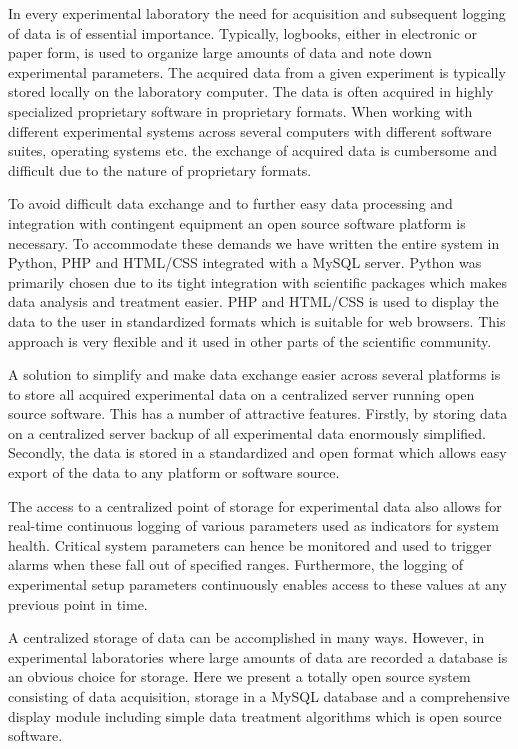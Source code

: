 In every experimental laboratory the need for acquisition and subsequent
logging of data is of essential importance. Typically, logbooks, either in
electronic or paper form, is used to organize large amounts of data and note
down experimental parameters. The acquired data from a given experiment is
typically stored locally on the laboratory computer. The data is often acquired
in highly specialized proprietary software in proprietary formats. When working
with different experimental systems across several computers with different
software suites, operating systems etc. the exchange of acquired data is
cumbersome and difficult due to the nature of proprietary formats.

To avoid difficult data exchange and to further easy data processing and
integration with contingent equipment an open source software platform is
necessary\cite{Benn2009,Murray2011,So2007}. To accommodate these demands we
have written the entire system in Python, PHP and HTML/CSS integrated with a
MySQL server. Python was primarily chosen due to its tight integration with
scientific packages which makes data analysis and treatment
easier\cite{Cahn2007}. PHP and HTML/CSS is used to display the data to the user
in standardized formats which is suitable for web browsers. This approach is
very flexible and it used in other parts of the scientific
community\cite{Crane2008}.

A solution to simplify and make data exchange easier across several platforms
is to store all acquired experimental data on a centralized server running open
source software. This has a number of attractive features.
Firstly, by storing data on a centralized server backup of all experimental
data enormously simplified. Secondly, the data is stored in a standardized and
open format which allows easy export of the data to any platform or software
source.

The access to a centralized point of storage for experimental data also allows
for real-time continuous logging of various parameters used as indicators for
system health. Critical system parameters can hence be monitored and used to
trigger alarms when these fall out of specified ranges. Furthermore, the
logging of experimental setup parameters continuously enables access to these
values at any previous point in time.

A centralized storage of data can be accomplished in many ways. However, in
experimental laboratories where large amounts of data are recorded a database
is an obvious choice for storage. Here we present a totally open source system
consisting of data acquisition, storage in a MySQL database and a comprehensive
display module including simple data treatment algorithms which is open source
software.

